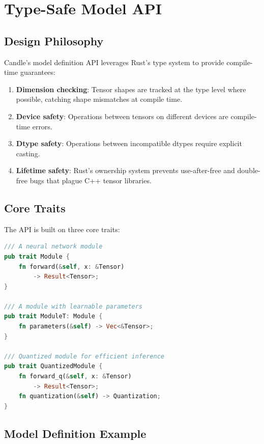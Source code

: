 \section{Type-Safe Model API}

\label{sec:api}

\subsection{Design Philosophy}

Candle's model definition API leverages Rust's type system to provide compile-time guarantees:

\begin{enumerate}[leftmargin=1.4em]
    \item \textbf{Dimension checking}: Tensor shapes are tracked at the type level where possible, catching shape mismatches at compile time.
    \item \textbf{Device safety}: Operations between tensors on different devices are compile-time errors.
    \item \textbf{Dtype safety}: Operations between incompatible dtypes require explicit casting.
    \item \textbf{Lifetime safety}: Rust's ownership system prevents use-after-free and double-free bugs that plague C++ tensor libraries.
\end{enumerate}

\subsection{Core Traits}

The API is built on three core traits:

\begin{lstlisting}[language=Rust,caption={Core Candle traits.}]
/// A neural network module
pub trait Module {
    fn forward(&self, x: &Tensor)
        -> Result<Tensor>;
}

/// A module with learnable parameters
pub trait ModuleT: Module {
    fn parameters(&self) -> Vec<&Tensor>;
}

/// Quantized module for efficient inference
pub trait QuantizedModule {
    fn forward_q(&self, x: &Tensor)
        -> Result<Tensor>;
    fn quantization(&self) -> Quantization;
}
\end{lstlisting}

\subsection{Model Definition Example}

